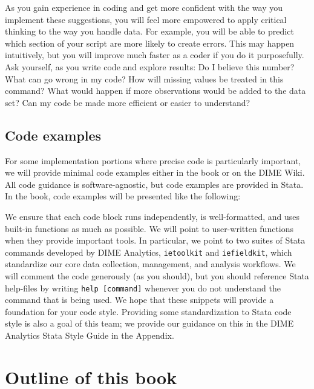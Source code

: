 As you gain experience in coding
and get more confident with the way you implement these suggestions,
you will feel more empowered to apply critical thinking to the way you handle data.
For example, you will be able to predict which section
of your script are more likely to create errors.
This may happen intuitively, but you will improve much faster as a coder
if you do it purposefully.
Ask yourself, as you write code and explore results:
Do I believe this number?
What can go wrong in my code?
How will missing values be treated in this command?
What would happen if more observations would be added to the data set?
Can my code be made more efficient or easier to understand?

\subsection{Code examples}
For some implementation portions where precise code is particularly important,
we will provide minimal code examples either in the book or on the DIME Wiki.
All code guidance is software-agnostic, but code examples are provided in Stata.
In the book, code examples will be presented like the following:


We ensure that each code block runs independently, is well-formatted,
and uses built-in functions as much as possible.
We will point to user-written functions when they provide important tools.
In particular, we point to two suites of Stata commands developed by DIME Analytics,
\texttt{ietoolkit} and
\texttt{iefieldkit},
which standardize our core data collection, management, and analysis workflows.
We will comment the code generously (as you should),
but you should reference Stata help-files by writing \texttt{help [command]}
whenever you do not understand the command that is being used.
We hope that these snippets will provide a foundation for your code style.
Providing some standardization to Stata code style is also a goal of this team;
we provide our guidance on this in the DIME Analytics Stata Style Guide in the Appendix.

\section{Outline of this book}


